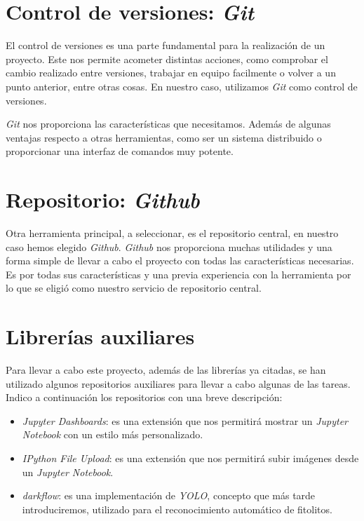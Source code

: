 \section{Control de versiones: \textit{Git}}

El control de versiones es una parte fundamental para la realización de un proyecto. Este nos permite acometer distintas acciones, como comprobar el cambio realizado entre versiones, trabajar en equipo facilmente o volver a un punto anterior, entre otras cosas. En nuestro caso, utilizamos \textit{Git} como control de versiones. 

\textit{Git} nos proporciona las características que necesitamos. Además de algunas ventajas respecto a otras herramientas, como ser un sistema distribuido o proporcionar una interfaz de comandos muy potente.


\section{Repositorio: \textit{Github}}

Otra herramienta principal, a seleccionar, es el repositorio central, en nuestro caso hemos elegido \textit{Github}. \textit{Github} nos proporciona muchas utilidades y una forma simple de llevar a cabo el proyecto con todas las características necesarias. Es por todas sus características y una previa experiencia con la herramienta por lo que se eligió como nuestro servicio de repositorio central.

\section{Librerías auxiliares}

Para llevar a cabo este proyecto, además de las librerías ya citadas, se han utilizado algunos repositorios auxiliares para llevar a cabo algunas de las tareas. Indico a continuación los repositorios con una breve descripción:

\begin{itemize}
	\item \textit{Jupyter Dashboards}: es una extensión que nos permitirá mostrar un \textit{Jupyter Notebook} con un estilo más personalizado.
	\item \textit{IPython File Upload}: es una extensión que nos permitirá subir imágenes desde un \textit{Jupyter Notebook}.
	\item \textit{darkflow}: es una implementación de \textit{YOLO}, concepto que más tarde introduciremos, utilizado para el reconocimiento automático de fitolitos.
\end{itemize}

